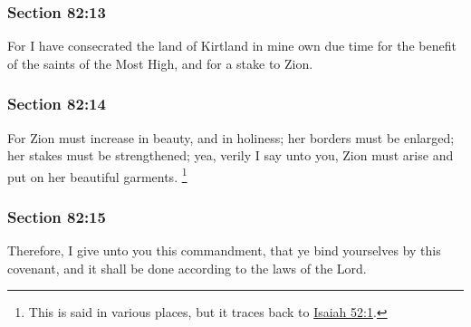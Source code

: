 	\subsubsection{Section 82:13} %
		\label{DC82-13}

		For I have consecrated the land of Kirtland in mine own due time for the benefit of the saints of the Most High, and for a stake to Zion.


	\subsubsection{Section 82:14} %
		\label{DC82-14}

		For Zion must increase in beauty, and in holiness; her borders must be enlarged; her stakes must be strengthened; yea, verily I say unto you, Zion must arise and put on her beautiful garments.%
			\footnote{%
				This is said in various places, but it traces back to \hyperref[ISAIAH-52-1]{Isaiah 52:1}.
				}


	\subsubsection{Section 82:15} %
		\label{DC82-15}

		Therefore, I give unto you this commandment, that ye bind yourselves by this covenant, and it shall be done according to the laws of the Lord.


